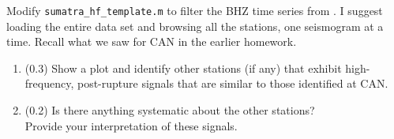 
Modify \verb+sumatra_hf_template.m+ to filter the BHZ time series from . 
I suggest loading the entire data set and browsing all the stations, one seismogram at a time.
Recall what we saw for CAN in the earlier homework.
%
\begin{enumerate}
\item (0.3) Show a plot and identify other stations (if any) that exhibit high-frequency, post-rupture signals that are similar to those identified at CAN.
\item (0.2) Is there anything systematic about the other stations? \\
Provide your interpretation of these signals.
\end{enumerate}
